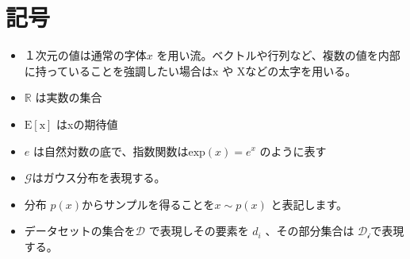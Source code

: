 \chapter*{記号}
\label{thanks}


\begin{itemize}
    \item １次元の値は通常の字体$ x $ を用い流。ベクトルや行列など、複数の値を内部に持っていることを強調したい場合は$ \mathrm{x} $ や $ \mathrm{X} $などの太字を用いる。
    \item $\mathbb{R}$ は実数の集合
    \item $\mathrm{E[x]}$ はxの期待値
    \item $e$ は自然対数の底で、指数関数は$\mathrm{exp}(x) = e^x$ のように表す
    \item $ \mathcal{G} $はガウス分布を表現する。
    \item 分布 $p(x)$からサンプルを得ることを$ x \sim p(x) $ と表記します。
    \item データセットの集合を$ \mathcal{D} $ で表現しその要素を $ d_i $ 、その部分集合は $ \mathcal{D_i} $で表現する。

\end{itemize}